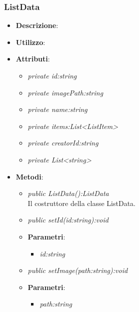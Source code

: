 \subsubsection{ListData}
\begin{itemize}
\item \textbf{Descrizione}:
\item \textbf{Utilizzo}:
\item \textbf{Attributi}: 
	\begin{itemize}
	\item \textit{private id:string}\\
	
	\item \textit{private imagePath:string}\\
	
	\item \textit{private name:string}\\
	
	\item \textit{private items:List<ListItem>}\\
	
	\item \textit{private creatorId:string}\\
	
	\item \textit{private List<string>}\\
	
	\end{itemize}
\item \textbf{Metodi}:
	\begin{itemize}
	\item \textit{public ListData():ListData}\\
	Il costruttore della classe ListData.
	\item \textit{public setId(id:string):void}\\
	
				\item{\textbf{Parametri}: \begin{itemize}
				\item \textit{id:string}\\

			\end{itemize}}
	\item \textit{public setImage(path:string):void}\\
	
				\item{\textbf{Parametri}: \begin{itemize}
				\item \textit{path:string}\\


\end{itemize}}
\end{itemize}
\end{itemize}
